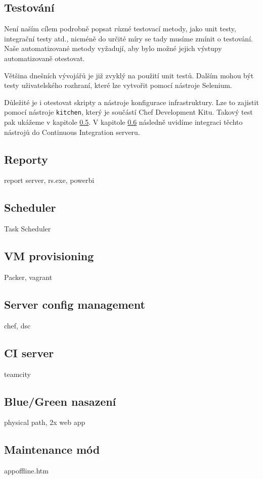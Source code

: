 \subsection{Testování}
Není naším cílem podrobně popsat různé testovací metody, jako unit testy, integrační testy atd., nicméně do určité míry se tady musíme zmínit o testování. Naše automatizované metody vyžadují, aby bylo možné jejich výstupy automatizovaně otestovat. 

Většina dnešních vývojářů je již zvyklý na použití unit testů. Dalším mohou být testy uživatelského rozhraní, které lze vytvořit pomocí nástroje Selenium.

Důležité je i otestovat skripty a nástroje konfigurace infrastruktury. Lze to zajistit pomocí nástroje \texttt{kitchen}, který je součástí Chef Development Kitu. Takový test pak ukážeme v kapitole \ref{ch:serverconfig}. V kapitole \ref{ch:ciserver} následně uvidíme integraci těchto nástrojů do Continuous Integration serveru. 

\subsection{Reporty}
report server, rs.exe, powerbi

\subsection{Scheduler}
Task Scheduler

\subsection{VM provisioning}
Packer, vagrant

\subsection{Server config management}
\label{ch:serverconfig}
chef, dsc

\subsection{CI server}
\label{ch:ciserver}
teamcity

\subsection{Blue/Green nasazení}
physical path, 2x web app

\subsection{Maintenance mód}
appoffline.htm

